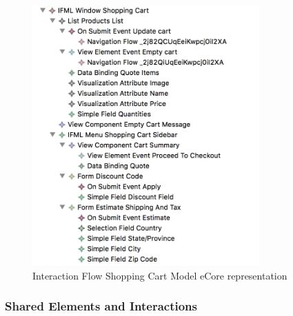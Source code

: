 \vspace{0.5cm}
\begin{figure}[H]
  \centering
    \includegraphics[height=10cm]{images/diagrams/before/ifml-hierarchy-shoppingcart.png}
  \caption{Interaction Flow Shopping Cart Model eCore representation}
  \label{fig:ifml-before-hierarchy-shoppingcart}
\end{figure}
\vspace{0.5cm}

\subsubsection{Shared Elements and Interactions}







